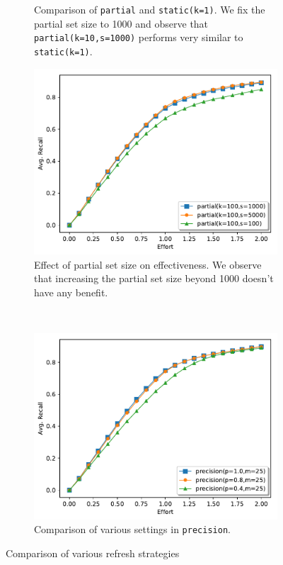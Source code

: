 \begin{figure}
\begin{subfigure}[t]{0.48\textwidth}
        \caption{Comparison of \texttt{partial} and \texttt{static(k=1)}. We fix
            the partial set size to 1000 and observe that
            \texttt{partial(k=10,s=1000)} performs very similar to
        \texttt{static(k=1)}.}
        \label{plot:partial1}
    \end{subfigure}

    \begin{subfigure}[t]{0.48\textwidth}
        \centering
        \includegraphics[width=\textwidth]{plots/partial2.pdf}
        \caption{Effect of partial set size on effectiveness. We observe that
        increasing the partial set size beyond 1000 doesn't have any benefit.}
        \label{plot:partial2}
    \end{subfigure}
    ~
    \begin{subfigure}[t]{0.48\textwidth}
        \centering
        \includegraphics[width=\textwidth]{plots/precision.pdf}
        \caption{Comparison of various settings in \texttt{precision}.}
        \label{plot:prec}
    \end{subfigure}
    \caption{Comparison of various refresh strategies}
\end{figure}


